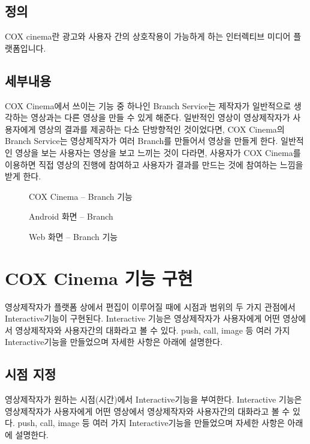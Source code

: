\documentclass{oblivoir}
\begin{document}
\subsection{정의}

COX cinema란 광고와 사용자 간의 상호작용이 가능하게 하는 인터렉티브 미디어 플랫폼입니다. 	


\subsection{ 세부내용}

COX Cinema에서 쓰이는 기능 중 하나인 Branch Service는 제작자가 일반적으로 생각하는 영상과는 다른 영상을 만들 수 있게 해준다. 일반적인 영상이 영상제작자가 사용자에게 영상의 결과를 제공하는 다소 단방향적인 것이었다면, COX Cinema의 Branch Service는 영상제작자가 여러 Branch를 만들어서 영상을 만들게 한다. 일반적인 영상을 보는 사용자는 영상을 보고 느끼는 것이 다라면, 사용자가 COX Cinema를 이용하면 직접 영상의 진행에 참여하고 사용자가 결과를 만드는 것에 참여하는 느낌을 받게 한다.     

\begin{figure}[h!]
\centering
\caption{COX Cinema – Branch 기능}
\end{figure}

\begin{figure}[h!]
\centering
\caption{Android 화면 – Branch }
\end{figure}

\begin{figure}[h!]
\centering
\caption{Web 화면 – Branch 기능}
\end{figure}


\section{ COX Cinema 기능 구현}
영상제작자가 플랫폼 상에서 편집이 이루어질 때에 시점과 범위의 두 가지 관점에서 Interactive기능이 구현된다. Interactive 기능은 영상제작자가 사용자에게 어떤 영상에서 영상제작자와 사용자간의 대화라고 볼 수 있다. push, call, image 등 여러 가지 Interactive기능을 만들었으며 자세한 사항은 아래에 설명한다.  

\subsection{시점 지정}

영상제작자가 원하는 시점(시간)에서 Interactive기능을 부여한다. Interactive 기능은 영상제작자가 사용자에게 어떤 영상에서 영상제작자와 사용자간의 대화라고 볼 수 있다. push, call, image 등 여러 가지 Interactive기능을 만들었으며 자세한 사항은 아래에 설명한다.  
\end{document}

